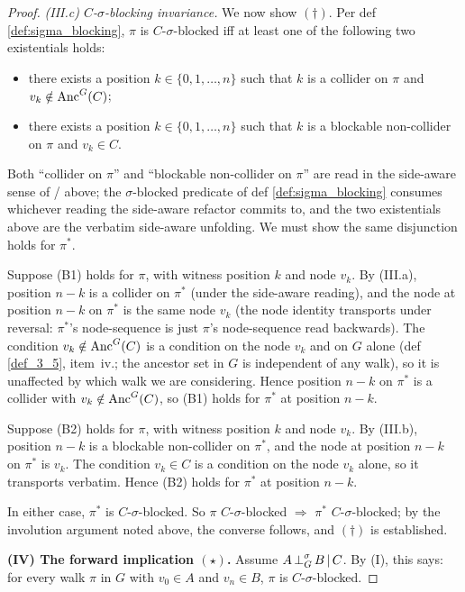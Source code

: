\documentclass[main]{subfiles}
\begin{document}
\begin{proof}
\smallskip\noindent\emph{(III.c) $C$-$\sigma$-blocking invariance.}
We now show $(\dagger)$. Per def \ref{def:sigma_blocking}, $\pi$ is $C$-$\sigma$-blocked iff at least one of the following two existentials holds:
\begin{itemize}
    \item[(B1)] there exists a position $k \in \{0, 1, \dots, n\}$ such that $k$ is a collider on $\pi$ and $v_k \notin \mathrm{Anc}^G(C)$;
    \item[(B2)] there exists a position $k \in \{0, 1, \dots, n\}$ such that $k$ is a blockable non-collider on $\pi$ and $v_k \in C$.
\end{itemize}
Both ``collider on $\pi$'' and ``blockable non-collider on $\pi$'' are read in the side-aware sense of  /  above; the $\sigma$-blocked predicate of def \ref{def:sigma_blocking} consumes whichever reading the side-aware refactor commits to, and the two existentials above are the verbatim side-aware unfolding. We must show the same disjunction holds for $\pi^*$.

Suppose (B1) holds for $\pi$, with witness position $k$ and node $v_k$. By (III.a), position $n - k$ is a collider on $\pi^*$ (under the side-aware reading), and the node at position $n - k$ on $\pi^*$ is the same node $v_k$ (the node identity transports under reversal: $\pi^*$'s node-sequence is just $\pi$'s node-sequence read backwards). The condition $v_k \notin \mathrm{Anc}^G(C)$ is a condition on the node $v_k$ and on $G$ alone (def \ref{def_3_5}, item~iv.; the ancestor set in $G$ is independent of any walk), so it is unaffected by which walk we are considering. Hence position $n - k$ on $\pi^*$ is a collider with $v_k \notin \mathrm{Anc}^G(C)$, so (B1) holds for $\pi^*$ at position $n - k$.

Suppose (B2) holds for $\pi$, with witness position $k$ and node $v_k$. By (III.b), position $n - k$ is a blockable non-collider on $\pi^*$, and the node at position $n - k$ on $\pi^*$ is $v_k$. The condition $v_k \in C$ is a condition on the node $v_k$ alone, so it transports verbatim. Hence (B2) holds for $\pi^*$ at position $n - k$.

In either case, $\pi^*$ is $C$-$\sigma$-blocked. So $\pi$ $C$-$\sigma$-blocked $\Rightarrow$ $\pi^*$ $C$-$\sigma$-blocked; by the involution argument noted above, the converse follows, and $(\dagger)$ is established.

\medskip\noindent\textbf{(IV) The forward implication $(\star)$.}
Assume $A \operatorname{\perp}^{\sigma}_G B \operatorname{|} C$. By (I), this says: for every walk $\pi$ in $G$ with $v_0 \in A$ and $v_n \in B$, $\pi$ is $C$-$\sigma$-blocked.


\end{proof}
\end{document}
